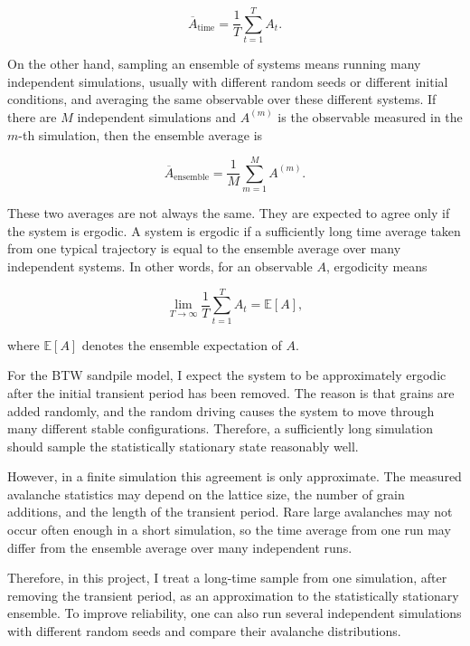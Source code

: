 \[
\overline{A}_{\mathrm{time}}
=
\frac{1}{T}
\sum_{t=1}^{T} A_t .
\]

On the other hand, sampling an ensemble of systems means running many independent simulations, usually with different random seeds or different initial conditions, and averaging the same observable over these different systems. If there are \(M\) independent simulations and \(A^{(m)}\) is the observable measured in the \(m\)-th simulation, then the ensemble average is

\[
\overline{A}_{\mathrm{ensemble}}
=
\frac{1}{M}
\sum_{m=1}^{M} A^{(m)} .
\]

These two averages are not always the same. They are expected to agree only if the system is ergodic. A system is ergodic if a sufficiently long time average taken from one typical trajectory is equal to the ensemble average over many independent systems. In other words, for an observable \(A\), ergodicity means

\[
\lim_{T\to\infty}
\frac{1}{T}
\sum_{t=1}^{T} A_t
=
\mathbb{E}[A],
\]

where \(\mathbb{E}[A]\) denotes the ensemble expectation of \(A\).

For the BTW sandpile model, I expect the system to be approximately ergodic after the initial transient period has been removed. The reason is that grains are added randomly, and the random driving causes the system to move through many different stable configurations. Therefore, a sufficiently long simulation should sample the statistically stationary state reasonably well.

However, in a finite simulation this agreement is only approximate. The measured avalanche statistics may depend on the lattice size, the number of grain additions, and the length of the transient period. Rare large avalanches may not occur often enough in a short simulation, so the time average from one run may differ from the ensemble average over many independent runs.

Therefore, in this project, I treat a long-time sample from one simulation, after removing the transient period, as an approximation to the statistically stationary ensemble. To improve reliability, one can also run several independent simulations with different random seeds and compare their avalanche distributions.